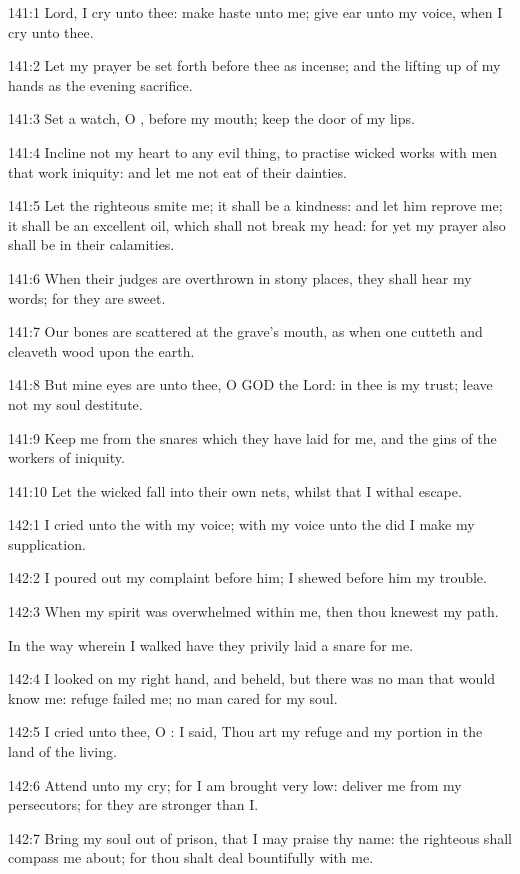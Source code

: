 141:1 Lord, I cry unto thee: make haste unto me; give ear unto my voice, when I cry unto thee.

141:2 Let my prayer be set forth before thee as incense; and the lifting up of my hands as the evening sacrifice.

141:3 Set a watch, O \LORD, before my mouth; keep the door of my lips.

141:4 Incline not my heart to any evil thing, to practise wicked works with men that work iniquity: and let me not eat of their dainties.

141:5 Let the righteous smite me; it shall be a kindness: and let him reprove me; it shall be an excellent oil, which shall not break my head: for yet my prayer also shall be in their calamities.

141:6 When their judges are overthrown in stony places, they shall hear my words; for they are sweet.

141:7 Our bones are scattered at the grave's mouth, as when one cutteth and cleaveth wood upon the earth.

141:8 But mine eyes are unto thee, O GOD the Lord: in thee is my trust; leave not my soul destitute.

141:9 Keep me from the snares which they have laid for me, and the gins of the workers of iniquity.

141:10 Let the wicked fall into their own nets, whilst that I withal escape.



142:1 I cried unto the \LORD with my voice; with my voice unto the \LORD did I make my supplication.

142:2 I poured out my complaint before him; I shewed before him my trouble.

142:3 When my spirit was overwhelmed within me, then thou knewest my path.

In the way wherein I walked have they privily laid a snare for me.

142:4 I looked on my right hand, and beheld, but there was no man that would know me: refuge failed me; no man cared for my soul.

142:5 I cried unto thee, O \LORD: I said, Thou art my refuge and my portion in the land of the living.

142:6 Attend unto my cry; for I am brought very low: deliver me from my persecutors; for they are stronger than I.

142:7 Bring my soul out of prison, that I may praise thy name: the righteous shall compass me about; for thou shalt deal bountifully with me.




